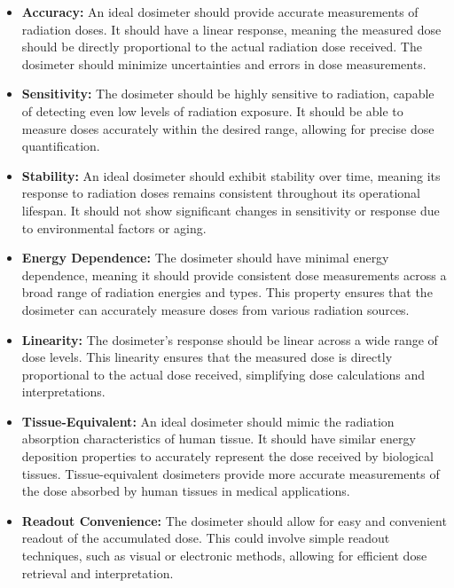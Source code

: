 \documentclass[../introduction.tex]{subfiles}
\begin{document}
        \begin{itemize}
            \item \textbf{Accuracy: } An ideal dosimeter should provide accurate measurements of radiation 
            doses. It should have a linear response, meaning the measured dose should be directly proportional 
            to the actual radiation dose received. The dosimeter should minimize uncertainties and errors in 
            dose measurements.

            \item \textbf{Sensitivity: } The dosimeter should be highly sensitive to radiation, capable of 
            detecting even low levels of radiation exposure. It should be able to measure doses accurately 
            within the desired range, allowing for precise dose quantification.

            \item \textbf{Stability: } An ideal dosimeter should exhibit stability over time, meaning its 
            response to radiation doses remains consistent throughout its operational lifespan. It should not 
            show significant changes in sensitivity or response due to environmental factors or aging.

            \item \textbf{Energy Dependence: } The dosimeter should have minimal energy dependence, meaning it 
            should provide consistent dose measurements across a broad range of radiation energies and types. 
            This property ensures that the dosimeter can accurately measure doses from various radiation sources.

            \item \textbf{Linearity: } The dosimeter's response should be linear across a wide range of dose 
            levels. This linearity ensures that the measured dose is directly proportional to the actual dose 
            received, simplifying dose calculations and interpretations.

            \item \textbf{Tissue-Equivalent: } An ideal dosimeter should mimic the radiation absorption 
            characteristics of human tissue. It should have similar energy deposition properties to accurately 
            represent the dose received by biological tissues. Tissue-equivalent dosimeters provide more 
            accurate measurements of the dose absorbed by human tissues in medical applications.

            \item \textbf{Readout Convenience: } The dosimeter should allow for easy and convenient readout 
            of the accumulated dose. This could involve simple readout techniques, such as visual or 
            electronic methods, allowing for efficient dose retrieval and interpretation.


\end{itemize}
\end{document}
